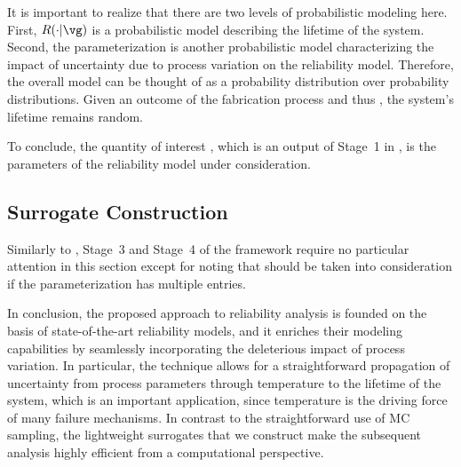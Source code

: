 \begin{remark} 
It is important to realize that there are two levels of probabilistic modeling
here. First, $R(\cdot | \vg)$ \perse is a probabilistic model describing the
lifetime \life of the system. Second, the parameterization \vg is another
probabilistic model characterizing the impact of uncertainty due to process
variation on the reliability model. Therefore, the overall model can be thought
of as a probability distribution over probability distributions. Given an
outcome of the fabrication process and thus \vg, the system's lifetime remains
random.
\end{remark}

To conclude, the quantity of interest \g, which is an output of Stage~1 in
, is the parameters \vg of the reliability model under
consideration.

\subsection{Surrogate Construction}

Similarly to , Stage~3 and Stage~4 of the
framework require no particular attention in this section except for noting that
 should be taken into consideration if the
parameterization \vg has multiple entries.

\conclusioncut
In conclusion, the proposed approach to reliability analysis is founded on the
basis of state-of-the-art reliability models, and it enriches their modeling
capabilities by seamlessly incorporating the deleterious impact of process
variation. In particular, the technique allows for a straightforward propagation
of uncertainty from process parameters through temperature to the lifetime of
the system, which is an important application, since temperature is the driving
force of many failure mechanisms. In contrast to the straightforward use of
\ac{MC} sampling, the lightweight surrogates that we construct make the
subsequent analysis highly efficient from a computational perspective.
